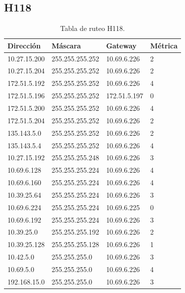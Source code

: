 \documentclass[12pt,titlepage]{article}
\begin{document}
\subsection{H118}
\begin{table}
  \begin{center}
    \begin{tabular}{|l|l|l|l|}
      \hline
        \bf{Direcci\'on} & \bf{M\'ascara} & \bf{Gateway} & \bf{M\'etrica} \\
      \hline 
	10.27.15.200  & 255.255.255.252 & 10.69.6.226 & 2 \\
        10.27.15.204  & 255.255.255.252 & 10.69.6.226 & 2 \\
        172.51.5.192  & 255.255.255.252 & 10.69.6.226 & 4 \\
        172.51.5.196  & 255.255.255.252 & 172.51.5.197 & 0 \\
        172.51.5.200  & 255.255.255.252 & 10.69.6.226 & 4 \\
        172.51.5.204  & 255.255.255.252 & 10.69.6.226 & 2 \\
        135.143.5.0   & 255.255.255.252 & 10.69.6.226 & 2 \\
        135.143.5.4   & 255.255.255.252 & 10.69.6.226 & 4 \\ 	
	10.27.15.192  & 255.255.255.248 & 10.69.6.226 & 3 \\
	10.69.6.128   & 255.255.255.224 & 10.69.6.226 & 4 \\
        10.69.6.160   & 255.255.255.224 & 10.69.6.226 & 4 \\
	10.39.25.64   & 255.255.255.224 & 10.69.6.226 & 3 \\       
	10.69.6.224   & 255.255.255.224 & 10.69.6.225 & 0 \\
	10.69.6.192   & 255.255.255.224 & 10.69.6.226 & 3 \\	
	10.39.25.0    & 255.255.255.192 & 10.69.6.226 & 2 \\
	10.39.25.128  & 255.255.255.128 & 10.69.6.226 & 1 \\
	10.42.5.0     & 255.255.255.0 & 10.69.6.226 & 3 \\
        10.69.5.0     & 255.255.255.0 & 10.69.6.226 & 4 \\
        192.168.15.0  & 255.255.255.0 & 10.69.6.226 & 3 \\  
    \hline
    \end{tabular} \\
  \end{center}
  \caption{Tabla de ruteo H118.}
\end{table}
\FloatBarrier
\end{document}
